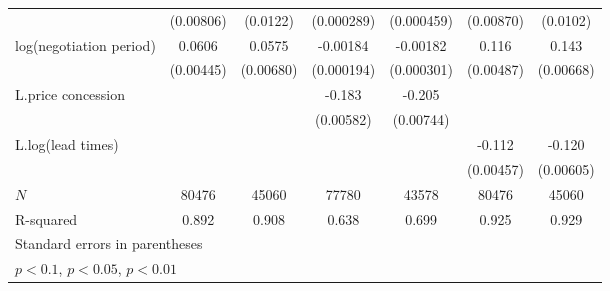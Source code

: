 {\begin{tabular}{l*{6}{c}}
            &   (0.00806)         &    (0.0122)         &  (0.000289)         &  (0.000459)         &   (0.00870)         &    (0.0102)         \\
\addlinespace
log(negotiation period)&      0.0606\sym{***}&      0.0575\sym{***}&    -0.00184\sym{***}&    -0.00182\sym{***}&       0.116\sym{***}&       0.143\sym{***}\\
            &   (0.00445)         &   (0.00680)         &  (0.000194)         &  (0.000301)         &   (0.00487)         &   (0.00668)         \\
\addlinespace
L.price concession&                     &                     &      -0.183\sym{***}&      -0.205\sym{***}&                     &                     \\
            &                     &                     &   (0.00582)         &   (0.00744)         &                     &                     \\
\addlinespace
L.log(lead times)   &                     &                     &                     &                     &      -0.112\sym{***}&      -0.120\sym{***}\\
            &                     &                     &                     &                     &   (0.00457)         &   (0.00605)         \\
\midrule
\(N\)       &       80476         &       45060         &       77780         &       43578         &       80476         &       45060         \\
R-squared   &       0.892         &       0.908         &       0.638         &       0.699         &       0.925         &       0.929         \\
\bottomrule
\multicolumn{7}{l}{\footnotesize Standard errors in parentheses}\\
\multicolumn{7}{l}{\footnotesize \sym{*} \(p<0.1\), \sym{**} \(p<0.05\), \sym{***} \(p<0.01\)}\\
\end{tabular}
}
